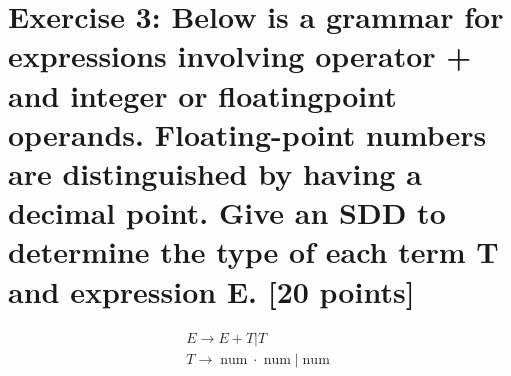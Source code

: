 \documentclass{article}
\begin{document}
    \section{Exercise 3: Below is a grammar for expressions involving operator + and integer or floatingpoint operands. Floating-point numbers are distinguished by having a decimal point. Give
    an SDD to determine the type of each term T and expression E. [20 points]}
    $$
        \begin{aligned} E \rightarrow E+T | T \\ T \rightarrow \operatorname{num} \cdot \operatorname{num} | \operatorname{num} \end{aligned}
    $$
    
\end{document}
